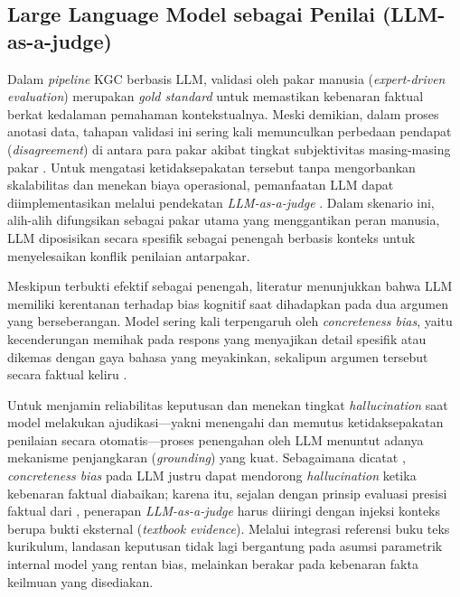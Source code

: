 \documentclass[../../thesis]{subfiles}
\begin{document}
\subsection{Large Language Model sebagai Penilai (LLM-as-a-judge)}

Dalam \textit{pipeline} KGC berbasis LLM, validasi oleh pakar manusia
(\textit{expert-driven evaluation}) merupakan \textit{gold standard}
untuk memastikan kebenaran faktual berkat kedalaman pemahaman
kontekstualnya. Meski demikian, dalam proses anotasi data, tahapan
validasi ini sering kali memunculkan perbedaan pendapat
(\textit{disagreement}) di antara para pakar akibat tingkat
subjektivitas masing-masing pakar \parencite{gu_survey_2024}. Untuk mengatasi ketidaksepakatan tersebut tanpa mengorbankan
skalabilitas dan menekan biaya operasional, pemanfaatan LLM dapat
diimplementasikan melalui pendekatan \textit{LLM-as-a-judge} \parencite{gu_survey_2024}.
Dalam skenario ini, alih-alih difungsikan sebagai pakar utama yang menggantikan peran
manusia, LLM diposisikan secara spesifik sebagai penengah berbasis konteks
untuk menyelesaikan konflik penilaian antarpakar.

Meskipun terbukti efektif sebagai penengah, literatur menunjukkan bahwa
LLM memiliki kerentanan terhadap bias kognitif saat dihadapkan pada dua
argumen yang berseberangan. Model sering kali terpengaruh oleh
\textit{concreteness bias}, yaitu kecenderungan memihak pada respons
yang menyajikan detail spesifik atau dikemas dengan gaya bahasa yang
meyakinkan, sekalipun argumen tersebut secara faktual keliru
\parencite{gu_survey_2024}.

Untuk menjamin reliabilitas keputusan dan menekan tingkat \textit{hallucination}
saat model melakukan ajudikasi---yakni menengahi dan memutus ketidaksepakatan
penilaian secara otomatis---proses penengahan oleh LLM menuntut
adanya mekanisme penjangkaran (\textit{grounding}) yang kuat. Sebagaimana dicatat
\textcite{gu_survey_2024}, \textit{concreteness bias} pada LLM justru dapat
mendorong \textit{hallucination} ketika kebenaran faktual diabaikan; karena itu,
sejalan dengan prinsip evaluasi presisi faktual dari \textcite{min_factscore_2023},
penerapan \textit{LLM-as-a-judge} harus diiringi dengan injeksi konteks berupa
bukti eksternal (\textit{textbook evidence}). Melalui integrasi referensi buku teks
kurikulum, landasan keputusan tidak lagi bergantung pada asumsi
parametrik internal model yang rentan bias, melainkan berakar pada
kebenaran fakta keilmuan yang disediakan.

\end{document}
